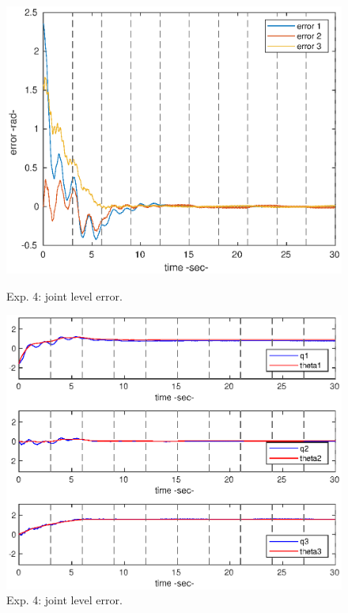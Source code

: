 \begin{center}
\begin{figure}[h!]
\begin{minipage}[h!]{0.45\linewidth}
\includegraphics[scale=0.5]{figures/4_lowerrorplot.eps}
\caption{\label{4_e} Exp. 4: joint level error.}
\includegraphics[scale=0.5]{figures/4_lowqthetaplot.eps}
\caption{\label{4_qt}Exp. 4: joint level error.}

\end{minipage}
\end{figure}
\end{center}
